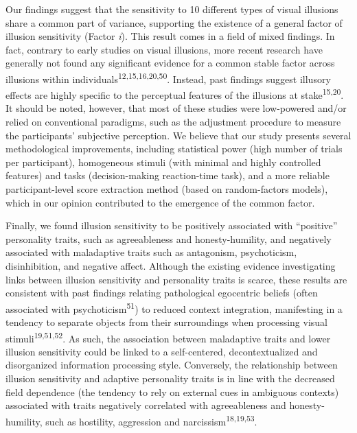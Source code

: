 \documentclass[
  man,floatsintext]{apa6}
\begin{document}
Our findings suggest that the sensitivity to 10 different types of visual illusions share a common part of variance, supporting the existence of a general factor of illusion sensitivity (Factor \emph{i}). This result comes in a field of mixed findings. In fact, contrary to early studies on visual illusions, more recent research have generally not found any significant evidence for a common stable factor across illusions within individuals\textsuperscript{12,15,16,20,50}. Instead, past findings suggest illusory effects are highly specific to the perceptual features of the illusions at stake\textsuperscript{15,20}. It should be noted, however, that most of these studies were low-powered and/or relied on conventional paradigms, such as the adjustment procedure to measure the participants' subjective perception. We believe that our study presents several methodological improvements, including statistical power (high number of trials per participant), homogeneous stimuli (with minimal and highly controlled features) and tasks (decision-making reaction-time task), and a more reliable participant-level score extraction method (based on random-factors models), which in our opinion contributed to the emergence of the common factor.

Finally, we found illusion sensitivity to be positively associated with ``positive'' personality traits, such as agreeableness and honesty-humility, and negatively associated with maladaptive traits such as antagonism, psychoticism, disinhibition, and negative affect. Although the existing evidence investigating links between illusion sensitivity and personality traits is scarce, these results are consistent with past findings relating pathological egocentric beliefs (often associated with psychoticism\textsuperscript{51}) to reduced context integration, manifesting in a tendency to separate objects from their surroundings when processing visual stimuli\textsuperscript{19,51,52}. As such, the association between maladaptive traits and lower illusion sensitivity could be linked to a self-centered, decontextualized and disorganized information processing style. Conversely, the relationship between illusion sensitivity and adaptive personality traits is in line with the decreased field dependence (the tendency to rely on external cues in ambiguous contexts) associated with traits negatively correlated with agreeableness and honesty-humility, such as hostility, aggression and narcissism\textsuperscript{18,19,53}.
\end{document}
